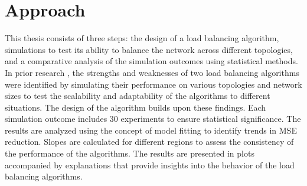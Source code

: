 \section{Approach}\label{sec:approach}
This thesis consists of three steps: the design of a load balancing algorithm, simulations to test its ability to balance the network across different topologies, and a comparative analysis of the simulation outcomes using statistical methods. In prior research \cite{Bayazitoglu}, the strengths and weaknesses of two load balancing algorithms were identified by simulating their performance on various topologies and network sizes to test the scalability and adaptability of the algorithms to different situations. The design of the algorithm builds upon these findings. Each simulation outcome includes 30 experiments to ensure statistical significance. The results are analyzed using the concept of model fitting to identify trends in MSE reduction. Slopes are calculated for different regions to assess the consistency of the performance of the algorithms. The results are presented in plots accompanied by explanations that provide insights into the behavior of the load balancing algorithms.
